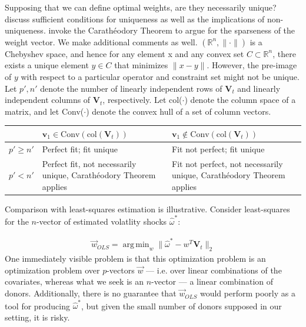 \documentclass[11pt,3p,review,authoryear]{elsarticle}
\newcommand{\V}{\textbf{V}}
\DeclareMathOperator*{\argmin}{arg\,min} %
\theoremstyle{definition}
\begin{document}
Supposing that we can define optimal weights, are they necessarily unique?  \cite{lin2021minimizing} discuss sufficient conditions for uniqueness as well as the implications of non-uniqueness.  \cite{abadie2022synthetic} invoke the Carath\'eodory Theorem to argue for the sparseness of the weight vector.  We make additional comments as well. $(\mathbb{R}^{n}, \|\cdot\|)$ is a Chebyshev space, and hence for any element x and any convex set $C\subset \mathbb{R}^{n}$, there exists a unique element $y\in C$ that minimizes $\|x-y\|$.  However, the pre-image of $y$ with respect to a particular operator and constraint set might not be unique.  Let $p', n'$ denote the number of linearly independent rows of $\V_{t}$ and linearly independent columns of $\V_{t}$, respectively.  Let col($\cdot$) denote the column space of a matrix, and let Conv($\cdot$) denote the convex hull of a set of column vectors.  \\

    \begin{center}
      \begin{tabular}{ | m{3em} | m{7cm}| m{7cm} | } 
        \hline
        & $\textbf{v}_{1}\in \text{Conv}(\text{col}(\V_{t}))$ & $\textbf{v}_{1} \notin \text{Conv}(\text{col}(\V_{t}))$\\ 
        \hline
        $p' \geq n'$ & Perfect fit; fit unique & Fit not perfect; fit unique \\
        \hline
        $p' < n'$ & Perfect fit, not necessarily unique, Carath\'eodory Theorem applies& Fit not perfect, not necessarily unique, Carath\'eodory Theorem applies \\ 
        \hline
      \end{tabular}
      \end{center} 

Comparison with least-squares estimation is illustrative.  Consider least-squares for the $n$-vector of estimated volatlity shocks $\hat\omega^{*}$:

\begin{align*}
\vec{w}_{OLS}=\argmin_{{w}} \|\hat{\omega}^{*} - w^{T}\textbf{V}_{t}\|_{2}
\end{align*} 
One immediately visible problem is that this optimization problem is an optimization problem over $p$-vectors $\vec{w}$ --- i.e. over linear combinations of the covariates, whereas what we seek is an $n$-vector --- a linear combination of donors.  Additionally, there is no guarantee that $\vec{w}_{OLS}$ would perform poorly as a tool for producing $\hat\omega^{*}$, but given the small number of donors supposed in our setting, it is risky.
\end{document}
